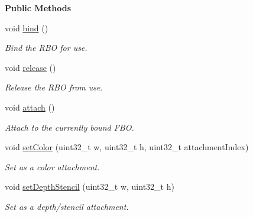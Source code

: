\begin{Indent}\textbf{ Public Methods}\par
\begin{DoxyCompactItemize}
\item 
\mbox{\label{classrev_1_1_render_buffer_object_af5673bc7c366748e711b23675a92233f}} 
void \mbox{\hyperlink{classrev_1_1_render_buffer_object_af5673bc7c366748e711b23675a92233f}{bind}} ()
\begin{DoxyCompactList}\small\item\em Bind the R\+BO for use. \end{DoxyCompactList}\item 
\mbox{\label{classrev_1_1_render_buffer_object_ac7c25f7173be8e7e467da0a677e534af}} 
void \mbox{\hyperlink{classrev_1_1_render_buffer_object_ac7c25f7173be8e7e467da0a677e534af}{release}} ()
\begin{DoxyCompactList}\small\item\em Release the R\+BO from use. \end{DoxyCompactList}\item 
\mbox{\label{classrev_1_1_render_buffer_object_a540de162f939c8cd978b9e221829807b}} 
void \mbox{\hyperlink{classrev_1_1_render_buffer_object_a540de162f939c8cd978b9e221829807b}{attach}} ()
\begin{DoxyCompactList}\small\item\em Attach to the currently bound F\+BO. \end{DoxyCompactList}\item 
\mbox{\label{classrev_1_1_render_buffer_object_aed5228094c7de676b4ad1803e1b10b73}} 
void \mbox{\hyperlink{classrev_1_1_render_buffer_object_aed5228094c7de676b4ad1803e1b10b73}{set\+Color}} (uint32\+\_\+t w, uint32\+\_\+t h, uint32\+\_\+t attachment\+Index)
\begin{DoxyCompactList}\small\item\em Set as a color attachment. \end{DoxyCompactList}\item 
\mbox{\label{classrev_1_1_render_buffer_object_abc3393909414facb6122c667a3323fb3}} 
void \mbox{\hyperlink{classrev_1_1_render_buffer_object_abc3393909414facb6122c667a3323fb3}{set\+Depth\+Stencil}} (uint32\+\_\+t w, uint32\+\_\+t h)
\begin{DoxyCompactList}\small\item\em Set as a depth/stencil attachment. \end{DoxyCompactList}\end{DoxyCompactItemize}
\end{Indent}
